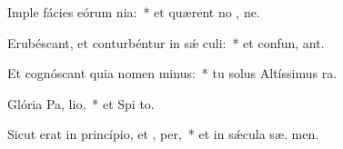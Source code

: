 \item Imple fácies eórum nia:~* et quærent no , ne.
\item Erubéscant, et conturbéntur in sǽ culi:~* et confun,  ant.
\item Et cognóscant quia nomen  minus:~* tu solus Altíssimus   ra.
\item Glória Pa,  lio,~* et Spi to.
\item Sicut erat in princípio, et ,  per,~* et in sǽcula sæ. men.
